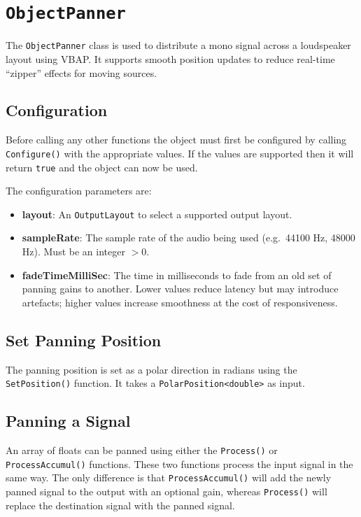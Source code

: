 \documentclass[12pt]{report}
\newcommand{\code}[1]{\texttt{#1}}
\begin{document}
\section{\code{ObjectPanner}}

The \code{ObjectPanner} class is used to distribute a mono signal across a loudspeaker layout using VBAP. It supports smooth position updates to reduce real-time ``zipper'' effects for moving sources.

\subsection{Configuration}

Before calling any other functions the object must first be configured by calling \code{Configure()} with the appropriate values. If the values are supported then it will return \code{true} and the object can now be used.

The configuration parameters are:

\begin{itemize}
  \item \textbf{layout}: An \code{OutputLayout} to select a supported output layout.
  \item \textbf{sampleRate}: The sample rate of the audio being used (e.g.\ 44100 Hz, 48000 Hz). Must be an integer $> 0$.
  \item \textbf{fadeTimeMilliSec}: The time in milliseconds to fade from an old set of panning gains to another. Lower values reduce latency but may introduce artefacts; higher values increase smoothness at the cost of responsiveness.
\end{itemize}

\subsection{Set Panning Position}

The panning position is set as a polar direction in radians using the \code{SetPosition()} function. It takes a \code{PolarPosition<double>} as input.

\subsection{Panning a Signal}

An array of floats can be panned using either the \code{Process()} or \code{ProcessAccumul()} functions. These two functions process the input signal in the same way. The only difference is that \code{ProcessAccumul()} will add the newly panned signal to the output with an optional gain, whereas \code{Process()} will replace the destination signal with the panned signal.
\end{document}
